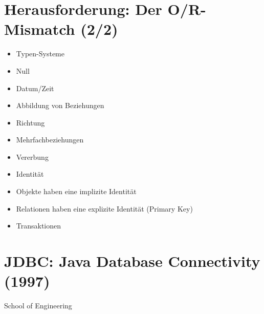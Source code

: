 \section*{Herausforderung: Der O/R-Mismatch (2/2)}
\begin{itemize}
  \item Typen-Systeme
  \item Null
  \item Datum/Zeit
  \item Abbildung von Beziehungen
  \item Richtung
  \item Mehrfachbeziehungen
  \item Vererbung
  \item Identität
  \item Objekte haben eine implizite Identität
  \item Relationen haben eine explizite Identität (Primary Key)
  \item Transaktionen
\end{itemize}

\section*{JDBC: Java Database Connectivity (1997)}
School of Engineering

